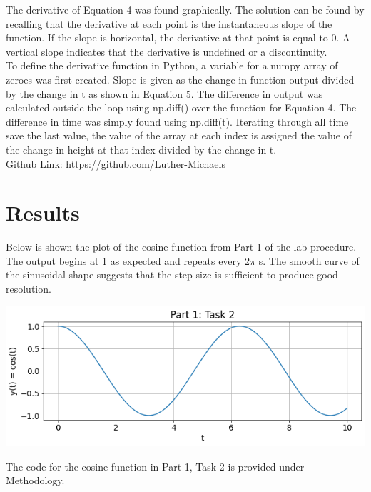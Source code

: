 \documentclass[12pt]{report}
\begin{document}
The derivative of Equation 4 was found graphically. The solution can be found by recalling that the derivative at each point is the instantaneous slope of the function. If the slope is horizontal, the derivative at that point is equal to 0. A vertical slope indicates that the derivative is undefined or a discontinuity. \\

To define the derivative function in Python, a variable for a numpy array of zeroes was first created. Slope is given as the change in function output divided by the change in t as shown in Equation 5. The difference in output was calculated outside the loop using np.diff() over the function for Equation 4. The difference in time was simply found using np.diff(t). Iterating through all time save the last value, the value of the array at each index is assigned the value of the change in height at that index divided by the change in t. \\

Github Link: \url{https://github.com/Luther-Michaels}

\section{Results}

Below is shown the plot of the cosine function from Part 1 of the lab procedure. The output begins at 1 as expected and repeats every 2$\pi$ s. The smooth curve of the sinusoidal shape suggests that the step size is sufficient to produce good resolution. \\

\begin{center}
    \includegraphics[scale = 0.48]{Lab 2 - Plots/Part1-Task2.png}\\[1.0 cm]
\end{center}

The code for the cosine function in Part 1, Task 2 is provided under Methodology. \\
\end{document}

